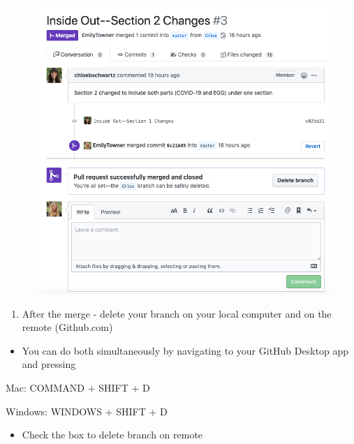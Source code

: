 \documentclass[]{book}
\providecommand{\tightlist}{%
  \setlength{\itemsep}{0pt}\setlength{\parskip}{0pt}}
\begin{document}
\begin{figure}
\centering
\includegraphics{images/research_protocols/github/28.png}
\caption{}
\end{figure}

\begin{enumerate}
\def\labelenumi{\arabic{enumi}.}
\setcounter{enumi}{8}
\tightlist
\item
  After the merge - delete your branch on your local computer and on the remote (Github.com)
\end{enumerate}

\begin{itemize}
\tightlist
\item
  You can do both simultaneously by navigating to your GitHub Desktop app and pressing
\end{itemize}

Mac: COMMAND + SHIFT + D

Windows: WINDOWS + SHIFT + D

\begin{itemize}
\tightlist
\item
  Check the box to delete branch on remote
\end{itemize}
\end{document}
